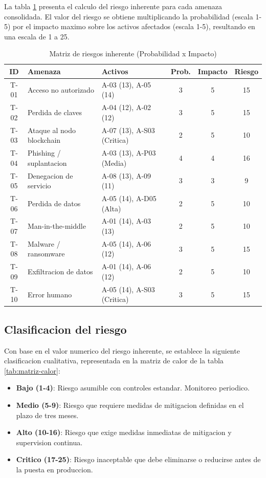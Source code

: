 \documentclass[11pt, a4paper]{article}
\begin{document}
La tabla \ref{tab:riesgos} presenta el calculo del riesgo inherente para cada amenaza consolidada. El valor del riesgo se obtiene multiplicando la probabilidad (escala 1-5) por el impacto maximo sobre los activos afectados (escala 1-5), resultando en una escala de 1 a 25.

\begin{table}[H]
\centering
\renewcommand{\arraystretch}{1.4}
\small
\begin{tabular}{|c|p{3cm}|p{3cm}|c|c|c|}
\hline
\textbf{ID} & \textbf{Amenaza} & \textbf{Activos} & \textbf{Prob.} & \textbf{Impacto} & \textbf{Riesgo} \\
\hline
T-01 & Acceso no autorizado & A-03 (13), A-05 (14) & 3 & 5 & 15 \\
\hline
T-02 & Perdida de claves & A-04 (12), A-02 (12) & 3 & 5 & 15 \\
\hline
T-03 & Ataque al nodo blockchain & A-07 (13), A-S03 (Critica) & 2 & 5 & 10 \\
\hline
T-04 & Phishing / suplantacion & A-03 (13), A-P03 (Media) & 4 & 4 & 16 \\
\hline
T-05 & Denegacion de servicio & A-08 (13), A-09 (11) & 3 & 3 & 9 \\
\hline
T-06 & Perdida de datos & A-05 (14), A-D05 (Alta) & 2 & 5 & 10 \\
\hline
T-07 & Man-in-the-middle & A-01 (14), A-03 (13) & 2 & 5 & 10 \\
\hline
T-08 & Malware / ransomware & A-05 (14), A-06 (12) & 3 & 5 & 15 \\
\hline
T-09 & Exfiltracion de datos & A-01 (14), A-06 (12) & 2 & 5 & 10 \\
\hline
T-10 & Error humano & A-05 (14), A-S03 (Critica) & 3 & 5 & 15 \\
\hline
\end{tabular}
\caption{Matriz de riesgos inherente (Probabilidad x Impacto)}
\label{tab:riesgos}
\end{table}

\subsection{Clasificacion del riesgo}

Con base en el valor numerico del riesgo inherente, se establece la siguiente clasificacion cualitativa, representada en la matriz de calor de la tabla \ref{tab:matriz-calor}:

\begin{itemize}
    \item \textbf{Bajo (1-4)}: Riesgo asumible con controles estandar. Monitoreo periodico.
    \item \textbf{Medio (5-9)}: Riesgo que requiere medidas de mitigacion definidas en el plazo de tres meses.
    \item \textbf{Alto (10-16)}: Riesgo que exige medidas inmediatas de mitigacion y supervision continua.
    \item \textbf{Critico (17-25)}: Riesgo inaceptable que debe eliminarse o reducirse antes de la puesta en produccion.
\end{itemize}
\end{document}
